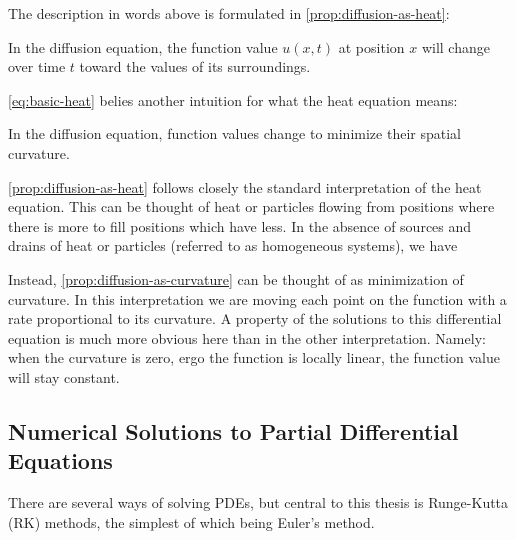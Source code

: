 \documentclass[../main.tex]{subfiles}
\begin{document}
    The description in words above is formulated in \autoref{prop:diffusion-as-heat}:

    \begin{proposition}\label{prop:diffusion-as-heat}
        In the diffusion equation, the function value $u(x, t)$ at position $x$ will change over time $t$ toward the values of its surroundings.
    \end{proposition}

    \autoref{eq:basic-heat} belies another intuition for what the heat equation means:

    \begin{proposition}\label{prop:diffusion-as-curvature}
        In the diffusion equation, function values change to minimize their spatial curvature.
    \end{proposition}

    \autoref{prop:diffusion-as-heat} follows closely the standard interpretation of the heat equation.
    This can be thought of heat or particles flowing from positions where there is more to fill positions which have less.
    In the absence of sources and drains of heat or particles (referred to as homogeneous systems), we have

    Instead, \autoref{prop:diffusion-as-curvature} can be thought of as minimization of curvature.
    In this interpretation we are moving each point on the function with a rate proportional to its curvature.
    A property of the solutions to this differential equation is much more obvious here than in the other interpretation.
    Namely: when the curvature is zero, ergo the function is locally linear, the function value will stay constant.

%
%
%

    \subsection{Numerical Solutions to Partial Differential Equations}\label{subsec:solving-partial-differential-equations}

    There are several ways of solving PDEs, but central to this thesis is Runge-Kutta (RK) methods, the simplest of which being Euler's method.
\end{document}
